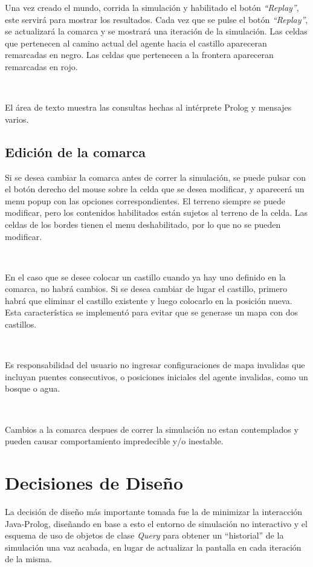 \documentclass[a4paper,12pt]{report}
\begin{document}
Una vez creado el mundo, corrida la simulaci\'{o}n y habilitado el bot\'{o}n \textit{``Replay''}, este servir\'{a} para
mostrar los resultados.
Cada vez que se pulse el bot\'{o}n \textit{``Replay''}, se actualizar\'{a} la comarca y se mostrar\'{a} una iteraci\'{o}n
de la simulaci\'{o}n.
Las celdas que pertenecen al camino actual del agente hacia el castillo apareceran remarcadas en negro.
Las celdas que pertenecen a la frontera apareceran remarcadas en rojo.

\

El \'{a}rea de texto muestra las consultas hechas al int\'{e}rprete Prolog y mensajes varios.

\section{Edici\'{o}n de la comarca}

Si se desea cambiar la comarca antes de correr la simulaci\'{o}n, se puede pulsar con el bot\'{o}n derecho del mouse
sobre la celda que se desea modificar, y aparecer\'{a} un menu popup con las opciones correspondientes.
El terreno siempre se puede modificar, pero los contenidos habilitados est\'{a}n sujetos al terreno de la celda.
Las celdas de los bordes tienen el menu deshabilitado, por lo que no se pueden modificar.

\

En el caso que se desee colocar un castillo cuando ya hay uno definido en la comarca, no habr\'{a} cambios.
Si se desea cambiar de lugar el castillo, primero habr\'{a} que eliminar el castillo existente y luego colocarlo en la
posici\'{o}n nueva.
Esta caracter\'{i}stica se implement\'{o} para evitar que se generase un mapa con dos castillos.

\

Es responsabilidad del usuario no ingresar configuraciones de mapa invalidas que incluyan puentes consecutivos, o
posiciones iniciales del agente invalidas, como un bosque o agua.

\

Cambios a la comarca despues de correr la simulaci\'{o}n no estan contemplados y pueden causar comportamiento
impredecible y/o inestable.

\chapter{Decisiones de Dise\~{n}o}

La decisi\'{o}n de dise\~{n}o m\'{a}s importante tomada fue la de minimizar la interacci\'{o}n Java-Prolog, dise\~{n}ando
en base a esto el entorno de simulaci\'{o}n no interactivo y el esquema de uso de objetos de clase \textit{Query} para
obtener un ``historial'' de la simulaci\'{o}n una vaz acabada, en lugar de actualizar la pantalla en cada iteraci\'{o}n
de la misma.
\end{document}
